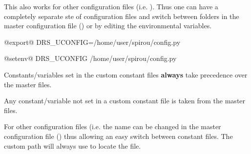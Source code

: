 \vspace{0.5cm}

\noindent This also works for other configuration files (i.e. ). Thus one can have a completely separate ste of configuration files and switch between folders in the master configuration file (\configtxtfile) or by editing the environmental variables.

\begin{bashbox}[title={e.g. in $\sim$/.bashrc or $\sim$/.bash\_profile}]
@export@ DRS_UCONFIG=/home/user/spirou/config.py
\end{bashbox}

\begin{cshbox}[title={e.g. in $\sim$/.tcshrc}]
@setenv@ DRS_UCONFIG /home/user/spirou/config.py
\end{cshbox}

\begin{note}
Constants/variables set in the custom constant files \textbf{always} take precedence over the master files.
\end{note}

\begin{note}
Any constant/variable not set in a custom constant file is taken from the master files.
\end{note}

\begin{note}
For other configuration files (i.e.  the name can be changed in the master configuration file (\configtxtfile) thus allowing an easy switch between constant files. The custom path will always use  to locate the file.
\end{note}